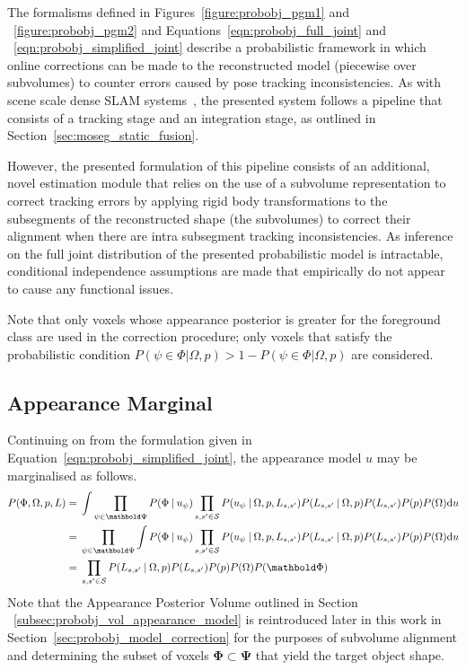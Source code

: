 The formalisms defined in Figures~\ref{figure:probobj_pgm1} and
~\ref{figure:probobj_pgm2} and Equations~\ref{eqn:probobj_full_joint} and
~\ref{eqn:probobj_simplified_joint} describe a probabilistic framework in which
online corrections can be made to the reconstructed model (piecewise over
subvolumes) to counter errors caused by pose tracking inconsistencies. As with
scene scale dense SLAM systems~\cite{Newcombe2011, Prisacariu2014, NieBner2013},
the presented system follows a pipeline that consists of a tracking stage and an
integration stage, as outlined in Section~\ref{sec:moseg_static_fusion}.

However, the presented formulation of this pipeline consists of an
additional, novel estimation module that relies on the use of a subvolume
representation to correct tracking errors by applying rigid body transformations
to the subsegments of the reconstructed shape (the subvolumes) to correct their
alignment when there are intra subsegment tracking inconsistencies. As inference
on the full joint distribution of the presented probabilistic model is intractable, 
conditional independence assumptions are made that empirically do not appear to 
cause any functional issues. 

Note that only voxels whose appearance posterior is greater for the foreground 
class are used in the correction procedure; only voxels that satisfy the probabilistic 
condition \(P(\psi \in \Phi | \Omega, p) > 1 - P(\psi \in \Phi | \Omega, p)\) are 
considered.

\subsection{Appearance Marginal}
Continuing on from the formulation given in Equation~\ref{eqn:probobj_simplified_joint}, 
the appearance model \(u\) may be marginalised as follows.
\begin{align}
  \label{eqn:probobj_appearance_marginal}
  P(\Phi, \Omega, p, L) ={}&
  \int
  \prod_{\psi \in \bm{\Psi}} P(\Phi \given u_{\psi})
  \prod_{s, s' \in \mathcal{S}}P(u_{\psi} \given \Omega, p, L_{s, s'})
  P(L_{s, s'} \given \Omega, p) P(L_{s, s'})P(p)P(\Omega) \intd{u} \\
  ={}& \prod_{\psi \in \bm{\Psi}} 
  \int P(\Phi \given u_{\psi})
  \prod_{s, s' \in \mathcal{S}}P(u_{\psi} \given \Omega, p, L_{s, s'})
  P(L_{s, s'} \given \Omega, p) P(L_{s, s'})P(p)P(\Omega) \intd{u} \\
  ={}& \prod_{s, s' \in \mathcal{S}} P(L_{s, s'} \given \Omega, p)
  P(L_{s, s'})P(p)P(\Omega)P(\bm{\Phi})
\end{align}
Note that the Appearance Posterior Volume outlined in Section 
~\ref{subsec:probobj_vol_appearance_model} is reintroduced later in this work in
Section~\ref{sec:probobj_model_correction} for the purposes of subvolume alignment 
and determining the subset of voxels \(\bm{\Phi} \subset \bm{\Psi}\) that yield the 
target object shape.


